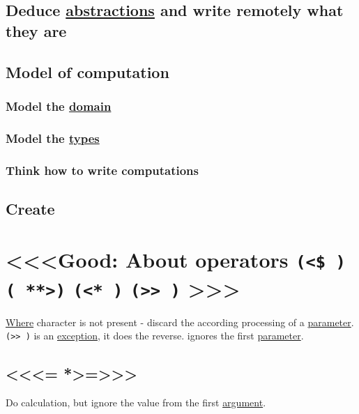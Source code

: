 \documentclass[a4paper,14pt,oneside]{book}
\begin{document}
{\section{Deduce \hyperref[org3137fb7]{abstractions} and write remotely what they are}
\label{sec:org91fbe91}

\section{Model of computation}
\label{sec:org725995f}

\subsection{Model the \hyperref[org17b9ae1]{domain}}
\label{sec:org8de0493}

\subsection{Model the \hyperref[org51532d9]{types}}
\label{sec:org961acf8}

\subsection{Think how to write computations}
\label{sec:org380c3c1}

\section{Create}
\label{sec:orgc2d6165}

\chapter{<<<Good: About operators \texttt{(<\$ )} \texttt{( **>)} \texttt{(<* )} \texttt{(>> )} >>>}
\label{sec:orgff0cd1c}
\hyperref[org5b6b021]{Where} character is not present - discard the according processing of a \hyperref[org0db8baa]{parameter}.\\
\texttt{(>> )} is an \hyperref[org617291e]{exception}, it does the reverse. ignores the first \hyperref[org0db8baa]{parameter}.\\

\section{<<<= *>=>>>}
\label{sec:orge987db6}
Do calculation, but ignore the value from the first \hyperref[orgdd12744]{argument}.\\

}
\end{document}
